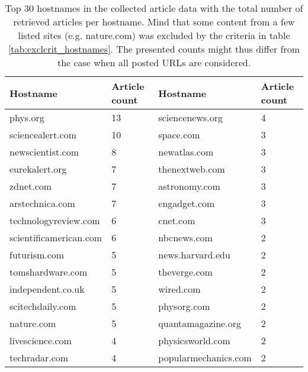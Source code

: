 \begin{table}
    \centering
\begin{tabular}{|lp{2cm}|lp{2cm}|}
\hline
 Hostname & Article count & Hostname & Article count \\
\hline
  phys.org               &                   13 & sciencenews.org      &                    4 \\
 sciencealert.com       &                   10 & space.com            &                    3 \\
 newscientist.com       &                    8 & newatlas.com         &                    3 \\
 eurekalert.org         &                    7 & thenextweb.com       &                    3 \\
 zdnet.com              &                    7 & astronomy.com        &                    3 \\
 arstechnica.com        &                    7 & engadget.com         &                    3 \\
 technologyreview.com   &                    6 & cnet.com             &                    3 \\
 scientificamerican.com &                    6 & nbcnews.com          &                    2 \\
 futurism.com           &                    5 & news.harvard.edu     &                    2 \\
 tomshardware.com       &                    5 & theverge.com         &                    2 \\
 independent.co.uk      &                    5 & wired.com            &                    2 \\
 scitechdaily.com       &                    5 & physorg.com          &                    2 \\
 nature.com             &                    5 & quantamagazine.org   &                    2 \\
 livescience.com        &                    4 & physicsworld.com     &                    2 \\
 techradar.com          &                    4 & popularmechanics.com &                    2 \\
\hline
\end{tabular}
\vspace{5pt}
    \caption{Top 30 hostnames in the collected article data with the total number of retrieved articles per hostname. Mind that some content from a few listed sites (e.g. nature.com) was excluded by the criteria in table \ref{tab:exclcrit_hostnames}. The presented counts might thus differ from the case when all posted URLs are considered.}
    \label{tab:top_hostnames_to_articles}
\end{table}